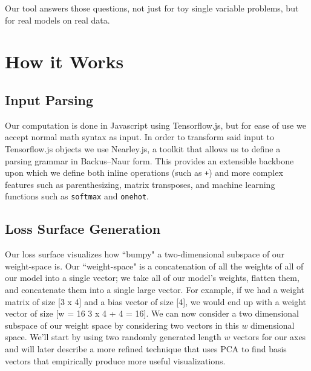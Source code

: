\documentclass[letterpaper]{article}
\begin{document}
Our tool answers those questions, not just for toy single variable problems, but for real models on real data.

\section{How it Works}
\subsection{Input Parsing}

Our computation is done in Javascript using Tensorflow.js, but for ease of use we accept normal math syntax as input.  In order to transform said input to Tensorflow.js objects we use Nearley.js, a toolkit that allows us to define a parsing grammar in Backus–Naur form.  This provides an extensible backbone upon which we define both inline operations (such as \texttt{+}) and more complex features such as parenthesizing, matrix transposes, and machine learning functions such as \texttt{softmax} and \texttt{onehot}. 

\subsection{Loss Surface Generation}
Our loss surface visualizes how ``bumpy" a two-dimensional subspace of our weight-space is.  Our ``weight-space" is a concatenation of all the weights of all of our model into a single vector; we  take all of our model's weights, flatten them, and concatenate them into a single large vector. For example, if we had a weight matrix of size [3 x 4] and a bias vector of size [4], we would end up with a weight vector of size [w = 16 3 x 4 + 4 = 16]. We can now consider a two dimensional subspace of our weight space by considering two vectors in this $w$ dimensional space. We'll start by using two randomly generated length $w$ vectors for our axes and will later describe a more refined technique that uses PCA to find basis vectors that empirically produce more useful visualizations.
\end{document}
